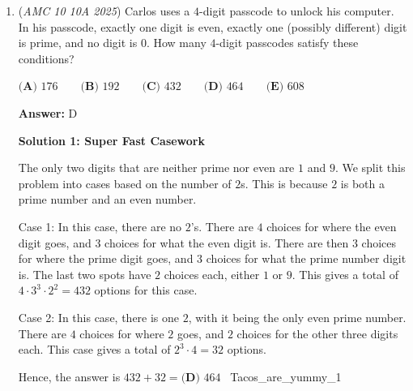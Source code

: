 \begin{enumerate}
\textbf{Solution 6 (start with the geometric sequence)}

Arithmetic sequences can be more flexible, so we start with the geometric sequence. The smallest possible geometric sequence that follows the criteria (increases, only integers) has a factor of $2$: $1, 2, 4, 8$. However, we cannot create an arithmetic sequence with its fourth element being $8$, since $(8-1)/3$ is not an integer. So, we take one step up to $1, 4, 16, 64$. $64-1$ is indeed divisible by $3$, giving us $63/3=21$. Thus, our arithmetic sequence is $1, 22, 43, 64$. Adding up all of our numbers, we have $22+43+4+16+64=\boxed{(E) 149}$.

 -mushroom427

 


	\item (\textit{AMC 10 10A 2025}) Carlos uses a $4$-digit passcode to unlock his computer. In his passcode, exactly one digit is even, exactly one (possibly different) digit is prime, and no digit is $0$. How many $4$-digit passcodes satisfy these conditions?


 $\textbf{(A) } 176 \qquad\textbf{(B) } 192 \qquad\textbf{(C) } 432 \qquad\textbf{(D) } 464 \qquad\textbf{(E) } 608$

 \textbf{Answer: }D



\textbf{Solution 1: Super Fast Casework}

The only two digits that are neither prime nor even are $1$ and $9$. We split this problem into cases based on the number of $2$s. This is because $2$ is both a prime number and an even number. 

 Case 1: In this case, there are no $2$'s. There are $4$ choices for where the even digit goes, and $3$ choices for what the even digit is. There are then $3$ choices for where the prime digit goes, and $3$ choices for what the prime number digit is. The last two spots have $2$ choices each, either $1$ or $9$. This gives a total of $4\cdot 3^3 \cdot 2^2 = 432$ options for this case. 

 Case 2:  In this case, there is one $2$, with it being the only even prime number. There are $4$ choices for where $2$ goes, and $2$ choices for the other three digits each. This case gives a total of $2^3\cdot 4 = 32$ options.  

 Hence, the answer is $432 + 32 = \boxed{\textbf{(D) }464}$ ~Tacos\_are\_yummy\_1

 




\end{enumerate}

